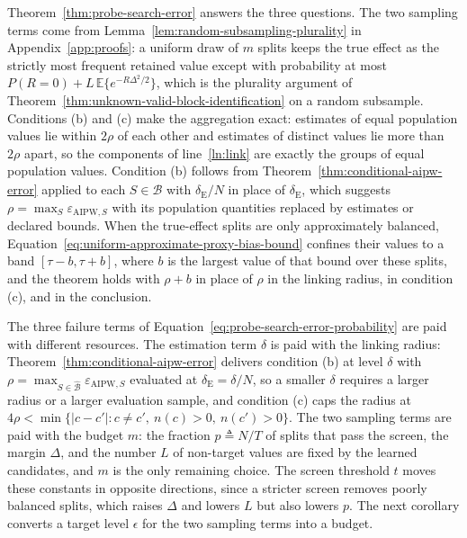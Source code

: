 Theorem~\ref{thm:probe-search-error} answers the three questions. The two sampling terms come from Lemma~\ref{lem:random-subsampling-plurality} in Appendix~\ref{app:proofs}: a uniform draw of $m$ splits keeps the true effect as the strictly most frequent retained value except with probability at most $P(R=0)+L\,\mathbb E\{e^{-R\Delta^2/2}\}$, which is the plurality argument of Theorem~\ref{thm:unknown-valid-block-identification} on a random subsample. Conditions (b) and (c) make the aggregation exact: estimates of equal population values lie within $2\rho$ of each other and estimates of distinct values lie more than $2\rho$ apart, so the components of line~\ref{ln:link} are exactly the groups of equal population values. Condition (b) follows from Theorem~\ref{thm:conditional-aipw-error} applied to each $S\in\widehat{\mathcal B}$ with $\delta_{\mathrm E}/N$ in place of $\delta_{\mathrm E}$, which suggests $\rho=\max_S\varepsilon_{\mathrm{AIPW},S}$ with its population quantities replaced by estimates or declared bounds. When the true-effect splits are only approximately balanced, Equation~\eqref{eq:uniform-approximate-proxy-bias-bound} confines their values to a band $[\tau-b,\tau+b]$, where $b$ is the largest value of that bound over these splits, and the theorem holds with $\rho+b$ in place of $\rho$ in the linking radius, in condition (c), and in the conclusion.

The three failure terms of Equation~\eqref{eq:probe-search-error-probability} are paid with different resources. The estimation term $\delta$ is paid with the linking radius: Theorem~\ref{thm:conditional-aipw-error} delivers condition (b) at level $\delta$ with $\rho=\max_{S\in\widehat{\mathcal B}}\varepsilon_{\mathrm{AIPW},S}$ evaluated at $\delta_{\mathrm E}=\delta/N$, so a smaller $\delta$ requires a larger radius or a larger evaluation sample, and condition (c) caps the radius at $4\rho<\min\{|c-c'|:c\ne c',\ n(c)>0,\ n(c')>0\}$. The two sampling terms are paid with the budget $m$: the fraction $p\triangleq N/T$ of splits that pass the screen, the margin $\Delta$, and the number $L$ of non-target values are fixed by the learned candidates, and $m$ is the only remaining choice. The screen threshold $t$ moves these constants in opposite directions, since a stricter screen removes poorly balanced splits, which raises $\Delta$ and lowers $L$ but also lowers $p$. The next corollary converts a target level $\epsilon$ for the two sampling terms into a budget.

